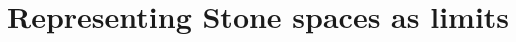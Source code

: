 \documentclass{../util/zariski}
\begin{document}
\section{Representing Stone spaces as limits}







%
%
%
%
%
%
%
%
%
%
%
%
%
%
%
%
%
%
%
\printbibliography
%
\end{document}
